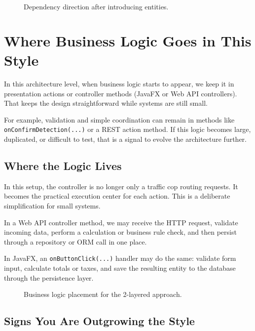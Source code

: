 \begin{figure}[htbp]
    \centering
    
    \caption{Dependency direction after introducing entities.}
    \label{fig:2_layered_dependency_rules}
\end{figure}

\section{Where Business Logic Goes in This Style}
\label{sec:2_layered_logic_placement}

In this architecture level, when business logic starts to appear, we keep it in presentation actions or controller methods (JavaFX or Web API controllers). That keeps the design straightforward while systems are still small.

For example, validation and simple coordination can remain in methods like \texttt{onConfirmDetection(...)} or a REST action method. If this logic becomes large, duplicated, or difficult to test, that is a signal to evolve the architecture further.

\subsection{Where the Logic Lives}
\label{sec:2_layered_where_logic_lives}

In this setup, the controller is no longer only a traffic cop routing requests. It becomes the practical execution center for each action. This is a deliberate simplification for small systems.

In a Web API controller method, we may receive the HTTP request, validate incoming data, perform a calculation or business rule check, and then persist through a repository or ORM call in one place.

In JavaFX, an \texttt{onButtonClick(...)} handler may do the same: validate form input, calculate totals or taxes, and save the resulting entity to the database through the persistence layer.

\begin{figure}[htbp]
    \centering
    
    \caption{Business logic placement for the 2-layered approach.}
    \label{fig:2_layered_logic_placement}
\end{figure}

\subsection{Signs You Are Outgrowing the Style}
\label{sec:2_layered_outgrowing}

